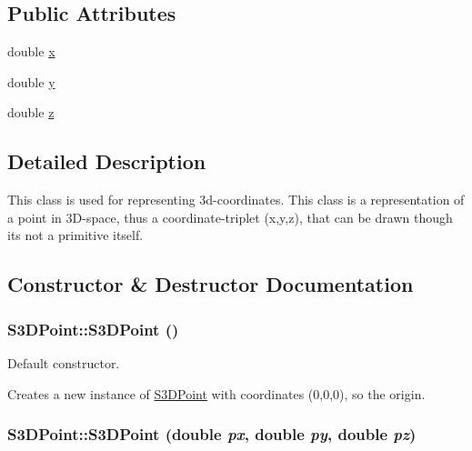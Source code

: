 \subsection*{Public Attributes}
\begin{DoxyCompactItemize}
\item 
double \hyperlink{class_s3_d_point_ae6b39611c603bd43ea67bcf4438a932a}{x}
\item 
double \hyperlink{class_s3_d_point_a487ab6dfdcb00ddbf9485f0b71ad7fb5}{y}
\item 
double \hyperlink{class_s3_d_point_ace7df3a87344170ddb4bfc92c3d5ec3d}{z}
\end{DoxyCompactItemize}


\subsection{Detailed Description}
This class is used for representing 3d-\/coordinates. This class is a representation of a point in 3D-\/space, thus a coordinate-\/triplet (x,y,z), that can be drawn though its not a primitive itself. 

\subsection{Constructor \& Destructor Documentation}
\hypertarget{class_s3_d_point_adad5537c6692acccab628a6bc105d20e}{
\subsubsection[{S3DPoint}]{\setlength{\rightskip}{0pt plus 5cm}S3DPoint::S3DPoint ()}}
\label{class_s3_d_point_adad5537c6692acccab628a6bc105d20e}


Default constructor. 

Creates a new instance of \hyperlink{class_s3_d_point}{S3DPoint} with coordinates (0,0,0), so the origin. \hypertarget{class_s3_d_point_ab03f0683b11340e8071eb8cdde1811b3}{
\subsubsection[{S3DPoint}]{\setlength{\rightskip}{0pt plus 5cm}S3DPoint::S3DPoint (double {\em px}, \/  double {\em py}, \/  double {\em pz})}}
\label{class_s3_d_point_ab03f0683b11340e8071eb8cdde1811b3}



